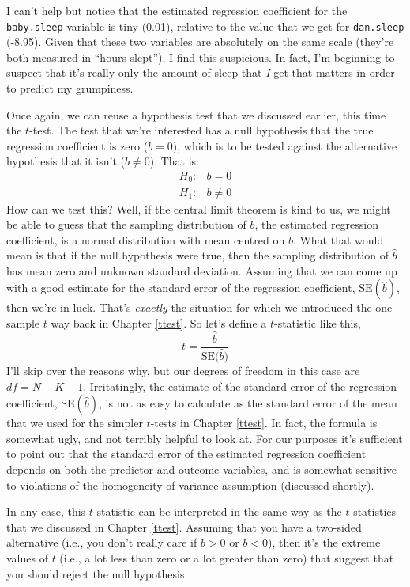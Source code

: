 \documentclass[
]{book}
\begin{document}
I can't help but notice that the estimated regression coefficient for the \texttt{baby.sleep} variable is tiny (0.01), relative to the value that we get for \texttt{dan.sleep} (-8.95). Given that these two variables are absolutely on the same scale (they're both measured in ``hours slept''), I find this suspicious. In fact, I'm beginning to suspect that it's really only the amount of sleep that \emph{I} get that matters in order to predict my grumpiness.

Once again, we can reuse a hypothesis test that we discussed earlier, this time the \(t\)-test. The test that we're interested has a null hypothesis that the true regression coefficient is zero (\(b = 0\)), which is to be tested against the alternative hypothesis that it isn't (\(b \neq 0\)). That is:
\[
\begin{array}{rl}
H_0: & b = 0 \\
H_1: & b \neq 0 
\end{array}
\]
How can we test this? Well, if the central limit theorem is kind to us, we might be able to guess that the sampling distribution of \(\hat{b}\), the estimated regression coefficient, is a normal distribution with mean centred on \(b\). What that would mean is that if the null hypothesis were true, then the sampling distribution of \(\hat{b}\) has mean zero and unknown standard deviation. Assuming that we can come up with a good estimate for the standard error of the regression coefficient, \(\mbox{SE}({\hat{b}})\), then we're in luck. That's \emph{exactly} the situation for which we introduced the one-sample \(t\) way back in Chapter \ref{ttest}. So let's define a \(t\)-statistic like this,
\[
t = \frac{\hat{b}}{\mbox{SE}({\hat{b})}}
\]
I'll skip over the reasons why, but our degrees of freedom in this case are \(df = N- K- 1\). Irritatingly, the estimate of the standard error of the regression coefficient, \(\mbox{SE}({\hat{b}})\), is not as easy to calculate as the standard error of the mean that we used for the simpler \(t\)-tests in Chapter \ref{ttest}. In fact, the formula is somewhat ugly, and not terribly helpful to look at.
For our purposes it's sufficient to point out that the standard error of the estimated regression coefficient depends on both the predictor and outcome variables, and is somewhat sensitive to violations of the homogeneity of variance assumption (discussed shortly).

In any case, this \(t\)-statistic can be interpreted in the same way as the \(t\)-statistics that we discussed in Chapter \ref{ttest}. Assuming that you have a two-sided alternative (i.e., you don't really care if \(b >0\) or \(b < 0\)), then it's the extreme values of \(t\) (i.e., a lot less than zero or a lot greater than zero) that suggest that you should reject the null hypothesis.
\end{document}
